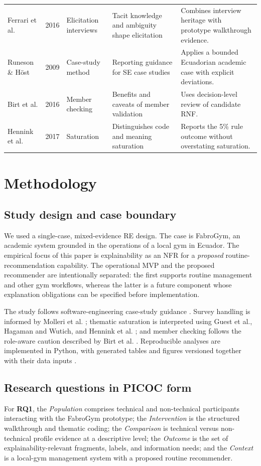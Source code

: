 \documentclass[pdflatex,sn-basic]{sn-jnl}
\begin{document}
{\begin{longtable}{@{}p{1.8cm}p{0.7cm}p{1.8cm}p{3.7cm}p{3.7cm}@{}}
Ferrari et al. \cite{ferrari2016} & 2016 & Elicitation interviews & Tacit knowledge and ambiguity shape elicitation & Combines interview heritage with prototype walkthrough evidence.\\
Runeson \& H\"ost \cite{runeson2009} & 2009 & Case-study method & Reporting guidance for SE case studies & Applies a bounded Ecuadorian academic case with explicit deviations.\\
Birt et al. \cite{birt2016} & 2016 & Member checking & Benefits and caveats of member validation & Uses decision-level review of candidate RNF.\\
Hennink et al. \cite{hennink2017} & 2017 & Saturation & Distinguishes code and meaning saturation & Reports the 5\% rule outcome without overstating saturation.\\
\end{longtable}
}

\section{Methodology}\label{sec:method}
\subsection{Study design and case boundary}
We used a single-case, mixed-evidence RE design. The case is FabroGym, an academic system grounded in the operations of a local gym in Ecuador. The empirical focus of this paper is explainability as an NFR for a \emph{proposed} routine-recommendation capability. The operational MVP and the proposed recommender are intentionally separated: the first supports routine management and other gym workflows, whereas the latter is a future component whose explanation obligations can be specified before implementation.

The study follows software-engineering case-study guidance \cite{runeson2009,wohlin2012,jedlitschka2008}. Survey handling is informed by Molleri et al. \cite{molleri2020}; thematic saturation is interpreted using Guest et al., Hagaman and Wutich, and Hennink et al. \cite{guest2006,hagaman2017,hennink2017}; and member checking follows the role-aware caution described by Birt et al. \cite{birt2016}. Reproducible analyses are implemented in Python, with generated tables and figures versioned together with their data inputs \cite{sandve2013,peng2011}.

\subsection{Research questions in PICOC form}
For \textbf{RQ1}, the \emph{Population} comprises technical and non-technical participants interacting with the FabroGym prototype; the \emph{Intervention} is the structured walkthrough and thematic coding; the \emph{Comparison} is technical versus non-technical profile evidence at a descriptive level; the \emph{Outcome} is the set of explainability-relevant fragments, labels, and information needs; and the \emph{Context} is a local-gym management system with a proposed routine recommender.
\end{document}
